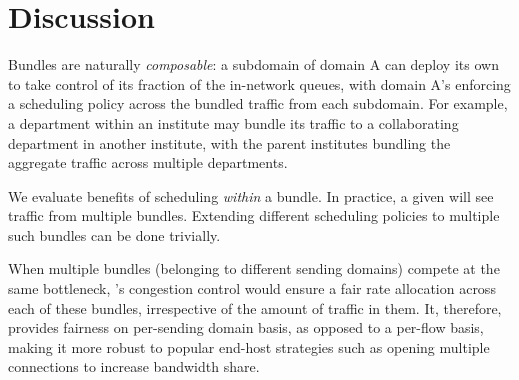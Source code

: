 \section{Discussion}\label{s:discussion}

 Bundles are naturally \emph{composable}: a subdomain of domain A can deploy its own \name to take control of its fraction of the in-network queues, with domain A's \name enforcing a scheduling policy across the bundled traffic from each subdomain.  
For example, a department within an institute may bundle its traffic to a collaborating department in another institute, with the parent institutes bundling the aggregate traffic across multiple departments.

 We evaluate benefits of scheduling \emph{within} a bundle. In practice, a given \inbox will see traffic from multiple bundles. Extending different scheduling policies to multiple such bundles can be done trivially.

 When multiple bundles (belonging to different sending domains) compete at the same bottleneck, \name's congestion control would ensure a fair rate allocation across each of these bundles, irrespective of the amount of traffic in them. It, therefore, provides fairness on per-sending domain basis, as opposed to a per-flow basis, making it more robust to popular end-host strategies such as opening multiple connections to increase bandwidth share. 
